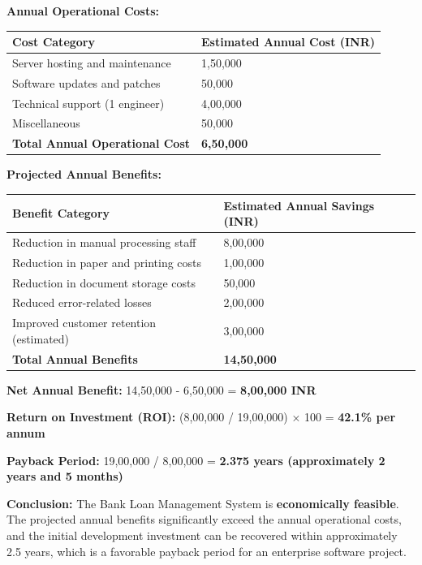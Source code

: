 \documentclass[12pt,a4paper,oneside]{report}
\begin{document}
\textbf{Annual Operational Costs:}

\begin{table}[htbp]
\centering
\small
\begin{tabularx}{\textwidth}{l l}
\toprule
\textbf{Cost Category} & \textbf{Estimated Annual Cost (INR)} \\
\midrule
Server hosting and maintenance & 1,50,000 \\
Software updates and patches & 50,000 \\
Technical support (1 engineer) & 4,00,000 \\
Miscellaneous & 50,000 \\
\textbf{Total Annual Operational Cost} & \textbf{6,50,000} \\
\bottomrule
\end{tabularx}
\end{table}

\textbf{Projected Annual Benefits:}

\begin{table}[htbp]
\centering
\small
\begin{tabularx}{\textwidth}{l l}
\toprule
\textbf{Benefit Category} & \textbf{Estimated Annual Savings (INR)} \\
\midrule
Reduction in manual processing staff & 8,00,000 \\
Reduction in paper and printing costs & 1,00,000 \\
Reduction in document storage costs & 50,000 \\
Reduced error-related losses & 2,00,000 \\
Improved customer retention (estimated) & 3,00,000 \\
\textbf{Total Annual Benefits} & \textbf{14,50,000} \\
\bottomrule
\end{tabularx}
\end{table}

\textbf{Net Annual Benefit:} 14,50,000 - 6,50,000 = \textbf{8,00,000 INR}

\textbf{Return on Investment (ROI):} (8,00,000 / 19,00,000) × 100 = \textbf{42.1\% per annum}

\textbf{Payback Period:} 19,00,000 / 8,00,000 = \textbf{2.375 years (approximately 2 years and 5 months)}

\textbf{Conclusion:} The Bank Loan Management System is \textbf{economically feasible}. The projected annual benefits significantly exceed the annual operational costs, and the initial development investment can be recovered within approximately 2.5 years, which is a favorable payback period for an enterprise software project.
\end{document}
